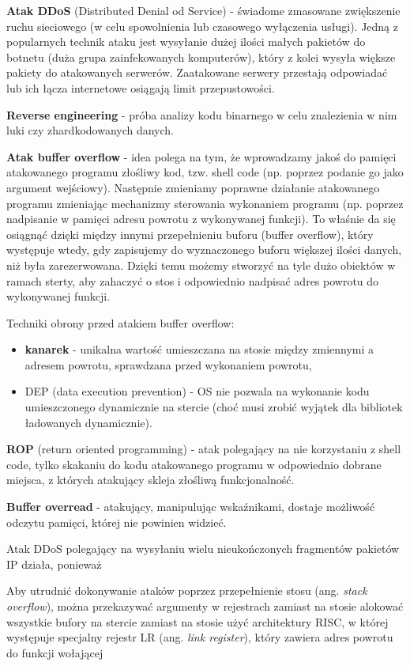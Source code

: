 \textbf{Atak DDoS} (Distributed Denial od Service) - świadome zmasowane zwiększenie ruchu sieciowego (w celu spowolnienia lub czasowego wyłączenia usługi). Jedną z popularnych technik ataku jest wysyłanie dużej ilości małych pakietów do botnetu (duża grupa zainfekowanych komputerów), który z kolei wysyła większe pakiety do atakowanych serwerów. Zaatakowane serwery przestają odpowiadać lub ich łącza internetowe osiągają limit przepustowości.

\textbf{Reverse engineering} - próba analizy kodu binarnego w celu znalezienia w nim luki czy zhardkodowanych danych.

\textbf{Atak buffer overflow} - idea polega na tym, że wprowadzamy jakoś do pamięci atakowanego programu złośliwy kod, tzw. shell code (np. poprzez podanie go jako argument wejściowy). Następnie zmieniamy poprawne działanie atakowanego programu zmieniając mechanizmy sterowania wykonaniem programu (np. poprzez nadpisanie w pamięci adresu powrotu z wykonywanej funkcji). To właśnie da się osiągnąć dzięki między innymi przepełnieniu buforu (buffer overflow), który występuje wtedy, gdy zapisujemy do wyznaczonego buforu większej ilości danych, niż była zarezerwowana. Dzięki temu możemy stworzyć na tyle dużo obiektów w ramach sterty, aby zahaczyć o stos i odpowiednio nadpisać adres powrotu do wykonywanej funkcji.

Techniki obrony przed atakiem buffer overflow:
\begin{itemize}
    \item \textbf{kanarek} - unikalna wartość umieszczana na stosie między zmiennymi a adresem powrotu, sprawdzana przed wykonaniem powrotu,
    \item DEP (data execution prevention) - OS nie pozwala na wykonanie kodu umieszczonego dynamicznie na stercie (choć musi zrobić wyjątek dla bibliotek ładowanych dynamicznie).
\end{itemize}

\textbf{ROP} (return oriented programming) - atak polegający na nie korzystaniu z shell code, tylko skakaniu do kodu atakowanego programu w odpowiednio dobrane miejsca, z których atakujący skleja złośliwą funkcjonalność.

\textbf{Buffer overread} - atakujący, manipulując wskaźnikami, dostaje możliwość odczytu pamięci, której nie powinien widzieć.

\begin{problems}
    \prob Atak DDoS polegający na wysyłaniu wielu nieukończonych fragmentów pakietów IP działa, ponieważ

    \prob Aby utrudnić dokonywanie ataków poprzez przepełnienie stosu (ang. \textit{stack overflow}), można
    \answers
    {przekazywać argumenty w rejestrach zamiast na stosie}
    {alokować wszystkie bufory na stercie zamiast na stosie}
    {użyć architektury RISC, w której występuje specjalny rejestr LR (ang. \textit{link register}), który zawiera adres powrotu do funkcji wołającej}
\end{problems}

